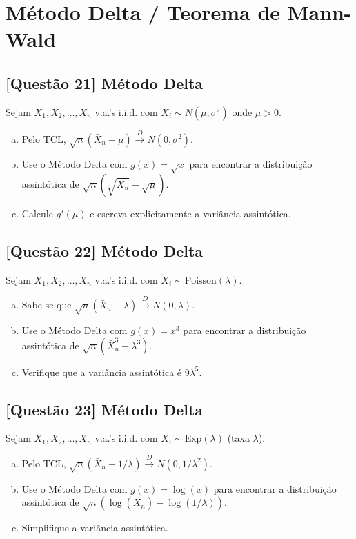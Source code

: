 \documentclass[12pt,a4paper]{article}
\begin{document}
\section{Método Delta / Teorema de Mann-Wald}

\subsection*{[Questão 21] Método Delta}

Sejam $X_1, X_2, \ldots, X_n$ v.a.'s i.i.d. com $X_i \sim N(\mu, \sigma^2)$ onde $\mu > 0$.

\begin{enumerate}[(a)]
    \item Pelo TCL, $\sqrt{n}(\bar{X}_n - \mu) \xrightarrow{D} N(0, \sigma^2)$.
    \item Use o Método Delta com $g(x) = \sqrt{x}$ para encontrar a distribuição assintótica de $\sqrt{n}(\sqrt{\bar{X}_n} - \sqrt{\mu})$.
    \item Calcule $g'(\mu)$ e escreva explicitamente a variância assintótica.
\end{enumerate}

\subsection*{[Questão 22] Método Delta}

Sejam $X_1, X_2, \ldots, X_n$ v.a.'s i.i.d. com $X_i \sim \text{Poisson}(\lambda)$.

\begin{enumerate}[(a)]
    \item Sabe-se que $\sqrt{n}(\bar{X}_n - \lambda) \xrightarrow{D} N(0, \lambda)$.
    \item Use o Método Delta com $g(x) = x^3$ para encontrar a distribuição assintótica de $\sqrt{n}(\bar{X}_n^3 - \lambda^3)$.
    \item Verifique que a variância assintótica é $9\lambda^5$.
\end{enumerate}

\subsection*{[Questão 23] Método Delta}

Sejam $X_1, X_2, \ldots, X_n$ v.a.'s i.i.d. com $X_i \sim \text{Exp}(\lambda)$ (taxa $\lambda$).

\begin{enumerate}[(a)]
    \item Pelo TCL, $\sqrt{n}(\bar{X}_n - 1/\lambda) \xrightarrow{D} N(0, 1/\lambda^2)$.
    \item Use o Método Delta com $g(x) = \log(x)$ para encontrar a distribuição assintótica de $\sqrt{n}(\log(\bar{X}_n) - \log(1/\lambda))$.
    \item Simplifique a variância assintótica.
\end{enumerate}
\end{document}
